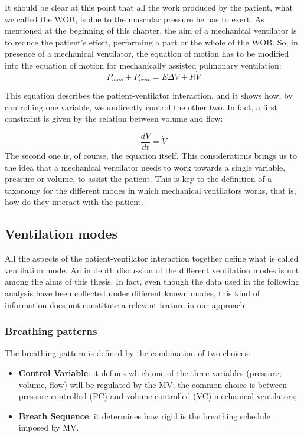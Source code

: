 \documentclass[a4paper, twoside]{article}
\begin{document}
    It should be clear at this point that all the work produced by the patient, what we called the WOB, is due to the muscular pressure he has to exert. As mentioned at the beginning of this chapter, the aim of a mechanical ventilator is to reduce the patient's effort, performing a part or the whole of the WOB. So, in presence of a mechanical ventilator, the equation of motion has to be modified into the equation of motion for mechanically assisted pulmonary ventilation:
    $$ P_{mus} + P_{vent} = E\Delta V + R\dot{V} $$

    This equation describes the patient-ventilator interaction, and it shows how, by controlling one variable, we undirectly control the other two. In fact, a first constraint is given by the relation between volume and flow:

    $$ \frac{dV}{dt} = \dot{V} $$
    The second one is, of course, the equation itself.
    This considerations brings us to the idea that a mechanical ventilator needs to work towards a single variable, pressure or volume, to assist the patient. This is key to the definition of a taxonomy for the different modes in which mechanical ventilators works, that is, how do they interact with the patient.

    \subsection{Ventilation modes}
    All the aspects of the patient-ventilator interaction together define what is called ventilation mode. An in depth discussion of the different ventilation modes is not among the aims of this thesis. In fact, even though the data used in the following analysis have been collected under different known modes, this kind of information does not constitute a relevant feature in our approach.

    \subsubsection{Breathing patterns}
    The breathing pattern is defined by the combination of two choices:
    \begin{itemize}
        \item \textbf{Control Variable}: it defines which one of the three variables (pressure, volume, flow) will be regulated by the MV; the common choice is between pressure-controlled (PC) and volume-controlled (VC) mechanical ventilators;
        \item \textbf{Breath Sequence}: it determines how rigid is the breathing schedule imposed by MV.
    \end{itemize}
\end{document}
